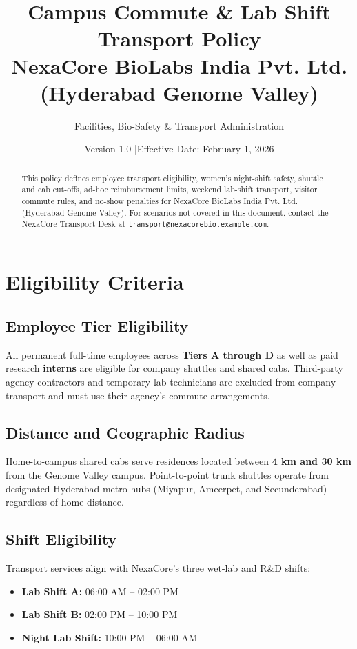\documentclass[11pt,a4paper]{article}
\title{\textbf{Campus Commute \& Lab Shift Transport Policy}\\[0.4em]
\large NexaCore BioLabs India Pvt. Ltd. (Hyderabad Genome Valley)}
\author{Facilities, Bio-Safety \& Transport Administration}
\date{Version 1.0 \quad|\quad Effective Date: February 1, 2026}
\begin{document}
\maketitle
\thispagestyle{fancy}

\begin{abstract}
This policy defines employee transport eligibility, women's night-shift safety, shuttle and cab cut-offs, ad-hoc reimbursement limits, weekend lab-shift transport, visitor commute rules, and no-show penalties for NexaCore BioLabs India Pvt. Ltd. (Hyderabad Genome Valley). For scenarios not covered in this document, contact the NexaCore Transport Desk at \texttt{transport@nexacorebio.example.com}.
\end{abstract}

\section{Eligibility Criteria}
\subsection{Employee Tier Eligibility}
All permanent full-time employees across \textbf{Tiers A through D} as well as paid research \textbf{interns} are eligible for company shuttles and shared cabs. Third-party agency contractors and temporary lab technicians are excluded from company transport and must use their agency's commute arrangements.

\subsection{Distance and Geographic Radius}
Home-to-campus shared cabs serve residences located between \textbf{4 km and 30 km} from the Genome Valley campus. Point-to-point trunk shuttles operate from designated Hyderabad metro hubs (Miyapur, Ameerpet, and Secunderabad) regardless of home distance.

\subsection{Shift Eligibility}
Transport services align with NexaCore's three wet-lab and R\&D shifts:
\begin{itemize}[noitemsep]
    \item \textbf{Lab Shift A:} 06:00 AM -- 02:00 PM
    \item \textbf{Lab Shift B:} 02:00 PM -- 10:00 PM
    \item \textbf{Night Lab Shift:} 10:00 PM -- 06:00 AM
\end{itemize}
\end{document}
